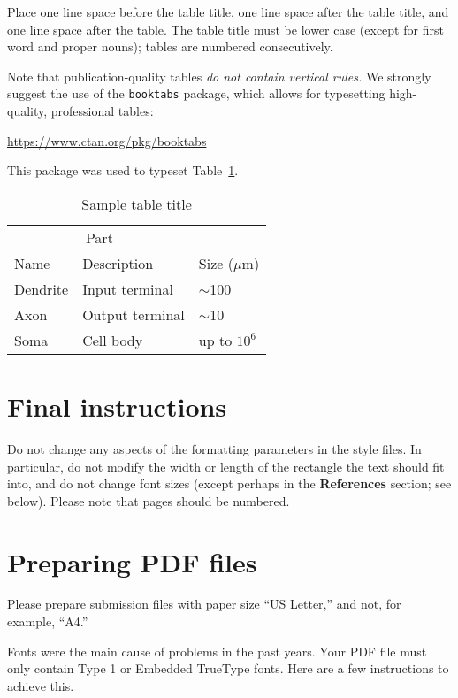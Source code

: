 \documentclass{article}
\begin{document}
	Place one line space before the table title, one line space after the
	table title, and one line space after the table. The table title must
	be lower case (except for first word and proper nouns); tables are
	numbered consecutively.
	
	Note that publication-quality tables \emph{do not contain vertical
		rules.} We strongly suggest the use of the \verb+booktabs+ package,
	which allows for typesetting high-quality, professional tables:
	\begin{center}
		\url{https://www.ctan.org/pkg/booktabs}
	\end{center}
	This package was used to typeset Table~\ref{sample-table}.
	
	\begin{table}
		\caption{Sample table title}
		\label{sample-table}
		\centering
		\begin{tabular}{lll}
			\toprule
			\multicolumn{2}{c}{Part}                   \\
			\cmidrule(r){1-2}
			Name     & Description     & Size ($\mu$m) \\
			\midrule
			Dendrite & Input terminal  & $\sim$100     \\
			Axon     & Output terminal & $\sim$10      \\
			Soma     & Cell body       & up to $10^6$  \\
			\bottomrule
		\end{tabular}
	\end{table}
	
	\section{Final instructions}
	
	Do not change any aspects of the formatting parameters in the style
	files.  In particular, do not modify the width or length of the
	rectangle the text should fit into, and do not change font sizes
	(except perhaps in the \textbf{References} section; see below). Please
	note that pages should be numbered.
	
	\section{Preparing PDF files}
	
	Please prepare submission files with paper size ``US Letter,'' and
	not, for example, ``A4.''
	
	Fonts were the main cause of problems in the past years. Your PDF file
	must only contain Type 1 or Embedded TrueType fonts. Here are a few
	instructions to achieve this.
	
\end{document}

